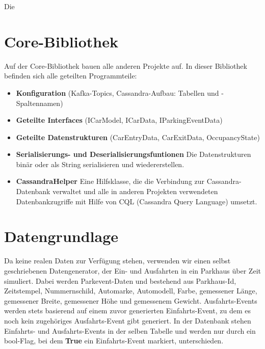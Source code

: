 Die 

\section{Core-Bibliothek}
Auf der Core-Bibliothek bauen alle anderen Projekte auf.
In dieser Bibliothek befinden sich alle geteilten Programmteile:
\begin{itemize}
    \item \textbf{Konfiguration} (Kafka-Topics, Cassandra-Aufbau: Tabellen und -Spaltennamen)
    \item \textbf{Geteilte Interfaces} (ICarModel, ICarData, IParkingEventData)
    \item \textbf{Geteilte Datenstrukturen} (CarEntryData, CarExitData, OccupancyState)
    \item \textbf{Serialisierungs- und Deserialisierungsfuntionen} Die Datenstrukturen bin\"ar oder als String serialisieren und wiedererstellen.
    \item \textbf{CassandraHelper} Eine Hilfsklasse, die die Verbindung zur Cassandra-Datenbank verwaltet und alle in anderen Projekten verwendeten Datenbankzugriffe mit Hilfe von CQL (Cassandra Query Language) umsetzt.
\end{itemize}


\section{Datengrundlage}
Da keine realen Daten zur Verf\"ugung stehen, verwenden wir einen selbst geschriebenen Datengenerator, der Ein- und Ausfahrten in ein Parkhaus über Zeit simuliert.
Dabei werden Parkevent-Daten  und  bestehend aus Parkhaus-Id, Zeitstempel, Nummernschild, Automarke, Automodell, Farbe, gemessener Länge, gemessener Breite, gemessener Höhe und gemessenem Gewicht.
Ausfahrts-Events werden stets basierend auf einem zuvor generierten Einfahrts-Event, zu dem es noch kein zugehöriges Ausfahrts-Event gibt generiert.
In der Datenbank stehen Einfahrts- und Ausfahrts-Events in der selben Tabelle und werden nur durch ein bool-Flag, bei dem \textbf{True} ein Einfahrts-Event markiert, unterschieden.


